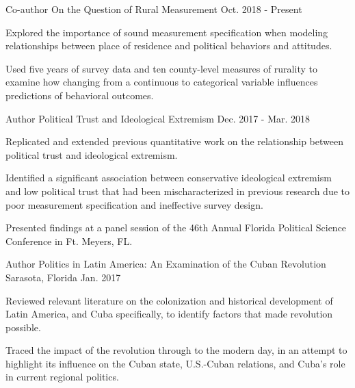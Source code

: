 \begin{cventries}
    \cventry
      {Co-author} %
      {On the Question of Rural Measurement} %
      {Oct. 2018 - Present} %
      {} %
      {
        \begin{cvitems} %
          \item {Explored the importance of sound measurement specification when modeling relationships between place of residence and political behaviors and attitudes.}
          \item {Used five years of survey data and ten county-level measures of rurality to examine how changing from a continuous to categorical variable influences predictions of behavioral outcomes.}
        \end{cvitems}
      }


    \cventry
      {Author} %
      {Political Trust and Ideological Extremism} %
      {Dec. 2017 - Mar. 2018} %
      {} %
      {
        \begin{cvitems} %
          \item {Replicated and extended previous quantitative work on the relationship between political trust and ideological extremism.}
          \item {Identified a significant association between conservative ideological extremism and low political trust that had been mischaracterized in previous research due to poor measurement specification and ineffective survey design.}
          \item {Presented findings at a panel session of the 46th Annual Florida Political Science Conference in Ft. Meyers, FL.}
        \end{cvitems}
      }


    \cventry
      {Author} %
      {Politics in Latin America: An Examination of the Cuban Revolution} %
      {Sarasota, Florida} %
      {Jan. 2017} %
      {
        \begin{cvitems} %
          \item {Reviewed relevant literature on the colonization and historical development of Latin America, and Cuba specifically, to identify factors that made revolution possible.}
          \item {Traced the impact of the revolution through to the modern day, in an attempt to highlight its influence on the Cuban state, U.S.-Cuban relations, and Cuba's role in current regional politics.}
        \end{cvitems}
      }


\end{cventries}
